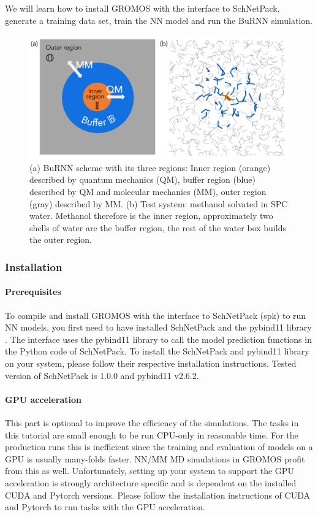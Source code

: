 We will learn how to install GROMOS with the interface to SchNetPack, generate a training data set, train the NN model and run the BuRNN simulation.


\begin{figure}[H]
\centering
\includegraphics[scale=.33]{../09_tutorial_06/figures/BuRNN_scheme}
\caption{(a) BuRNN scheme with its three regions: Inner region (orange) described by quantum mechanics (QM), buffer region (blue) described by QM and molecular mechanics (MM), outer region (gray) described by MM. (b) Test system: methanol solvated in SPC water. Methanol therefore is the inner region, approximately two shells of water are the buffer region, the rest of the water box builds the outer region.}
\label{BuRNN_scheme}
\end{figure}


\subsubsection{Installation}
\paragraph{Prerequisites}
To compile and install GROMOS with the interface to SchNetPack (spk) to run NN models, you first need to have installed SchNetPack and the pybind11 library \cite{pybind11}. The interface uses the pybind11 library to call the model prediction functions in the Python code of SchNetPack. To install the SchNetPack and pybind11 library on your system, please follow their respective installation instructions. Tested version of SchNetPack is 1.0.0 and pybind11 v2.6.2.

\paragraph{GPU acceleration}
This part is optional to improve the efficiency of the simulations. The tasks in this tutorial are small enough to be run CPU-only in reasonable time. For the production runs this is inefficient since the training and evaluation of models on a GPU is usually many-folds faster. NN/MM MD simulations in GROMOS profit from this as well. Unfortunately, setting up your system to support the GPU acceleration is strongly architecture specific and is dependent on the installed CUDA and Pytorch versions. Please follow the installation instructions of CUDA and Pytorch to run tasks with the GPU acceleration.

